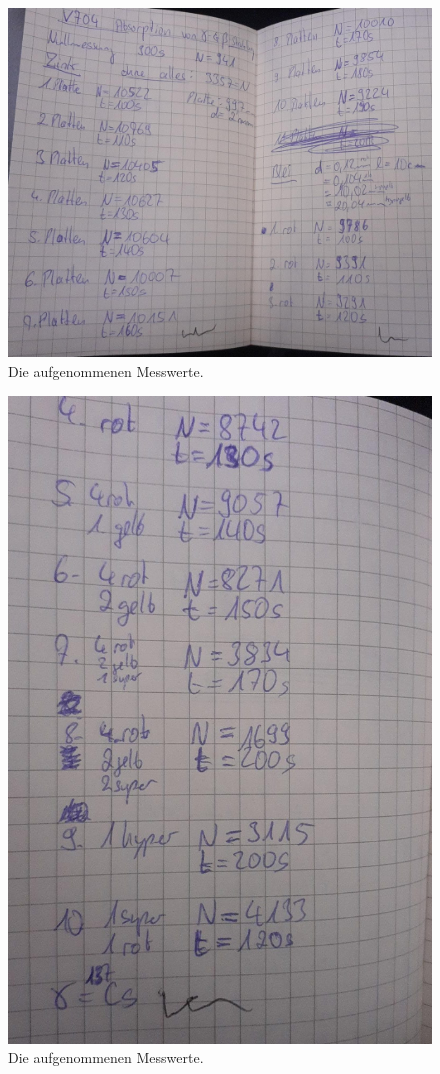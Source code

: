 \begin{figure}[H]
  \centering
  \includegraphics{content/mess1.jpg}
  \caption{Die aufgenommenen Messwerte.}
  \label{fig:mess1}
\end{figure}
\begin{figure}[H]
  \centering
  \includegraphics{content/mess2.jpg}
  \caption{Die aufgenommenen Messwerte.}
  \label{fig:mess2}
\end{figure}
